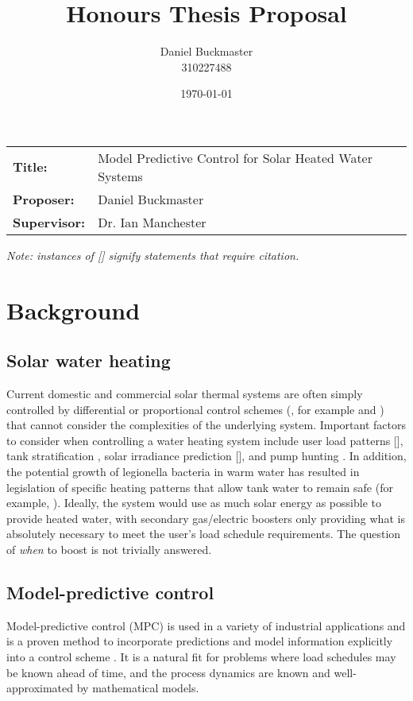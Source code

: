 \documentclass{article}
\title{Honours Thesis Proposal}
\date{\today}
\author{Daniel Buckmaster \\ 310227488}
\begin{document}
\maketitle

\begin{tabular}{ll}
	{\bf Title:} & Model Predictive Control for Solar Heated Water Systems \\
	{\bf Proposer:} & Daniel Buckmaster \\
	{\bf Supervisor:} & Dr. Ian Manchester \\
\end{tabular}

\vspace{5mm}

{\it Note: instances of [] signify statements that require citation.}

\section{Background}

\subsection{Solar water heating}

Current domestic and commercial solar thermal systems are often simply controlled
by differential or proportional control schemes (\cite{LSTS}, for example \cite{Hasan11} and \cite{Cao14})
that cannot consider the complexities of the underlying system.
Important factors to consider when controlling a water heating system include
user load patterns [], tank stratification \cite{Hollands89}, solar irradiance
prediction [], and pump hunting \cite{LSTS}.
In addition, the potential growth of legionella bacteria in warm water has
resulted in legislation of specific heating patterns that allow tank water to
remain safe (for example, \cite{AS3666}).
Ideally, the system would use as much solar energy as possible to provide heated
water, with secondary gas/electric boosters only providing what is absolutely
necessary to meet the user's load schedule requirements.
The question of {\it when} to boost is not trivially answered.

\subsection{Model-predictive control}

Model-predictive control (MPC) is used in a variety of industrial applications
\cite{Allgower04} and is a proven method to incorporate predictions and model
information explicitly into a control scheme \cite{Camacho04}.
It is a natural fit for problems where load schedules may be known ahead of time,
and the process dynamics are known and well-approximated by mathematical models.
\end{document}
